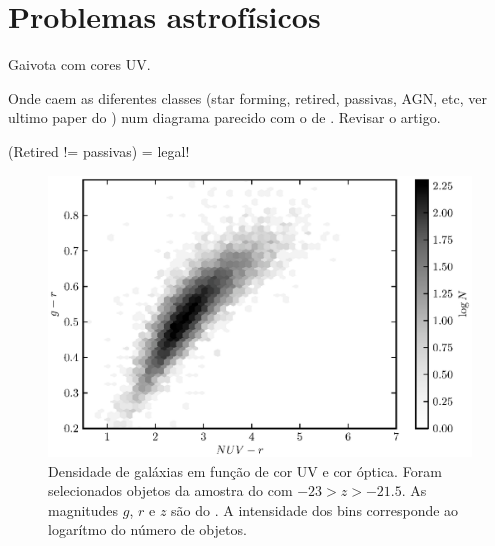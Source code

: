 



\chapter{Problemas astrofísicos}
\label{sec:Problemas}

Gaivota com cores UV.

Onde caem as diferentes classes (star forming, retired, passivas, AGN, etc, ver
ultimo paper do \citet{CidFernandes2011}) num diagrama parecido com o de
\citet{Chilingarian2011}. Revisar o artigo. 

(Retired != passivas) = legal!

\begin{figure}
	\includegraphics{figuras/uvcolor-color-density.eps}
	\caption[Densidade de galáxias no diagrama cor--cor UV.]
	{Densidade de galáxias em função de cor UV e cor óptica. Foram selecionados
	objetos da amostra do \starlight com $-23 > z > -21.5$. As magnitudes $g$, $r$
	e $z$ são do \SDSS. A intensidade dos bins corresponde ao logarítmo do número
	de objetos.}
	\label{fig:DensityColor}
\end{figure}

